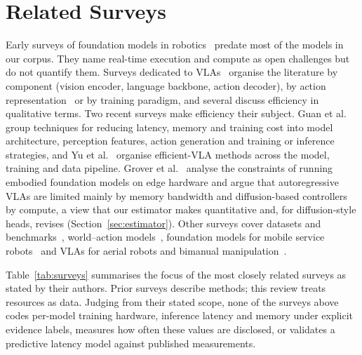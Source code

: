 \documentclass[applsci,review,submit,pdftex,oneauthor]{Definitions/mdpi}
\begin{document}
\section{Related Surveys}\label{sec:related}

Early surveys of foundation models in robotics~\cite{firoozi2023,hu2023toward,kawaharazuka2024real} predate most of the models in our corpus. They name real-time execution and compute as open challenges but do not quantify them. Surveys dedicated to VLAs~\cite{ma2024survey,adilkhanov2025,sapkota2025,zhong2025token,din2025,shao2025,li2025survey,zhang2025pure,kawaharazuka2025vla} organise the literature by component (vision encoder, language backbone, action decoder), by action representation~\cite{zhong2025token} or by training paradigm, and several discuss efficiency in qualitative terms. Two recent surveys make efficiency their subject. Guan et al.~\cite{guan2025efficient} group techniques for reducing latency, memory and training cost into model architecture, perception features, action generation and training or inference strategies, and Yu et al.~\cite{yu2025efficient} organise efficient-VLA methods across the model, training and data pipeline. Grover et al.~\cite{grover2026edge} analyse the constraints of running embodied foundation models on edge hardware and argue that autoregressive VLAs are limited mainly by memory bandwidth and diffusion-based controllers by compute, a view that our estimator makes quantitative and, for diffusion-style heads, revises (Section~\ref{sec:estimator}). Other surveys cover datasets and benchmarks~\cite{wang2026data}, world--action models~\cite{shen2026wam,lu2026wam}, foundation models for mobile service robots~\cite{lisondra2025} and VLAs for aerial robots and bimanual manipulation~\cite{sa2026drones}.

Table~\ref{tab:surveys} summarises the focus of the most closely related surveys as stated by their authors. Prior surveys describe methods; this review treats resources as data. Judging from their stated scope, none of the surveys above codes per-model training hardware, inference latency and memory under explicit evidence labels, measures how often these values are disclosed, or validates a predictive latency model against published measurements.
\end{document}
